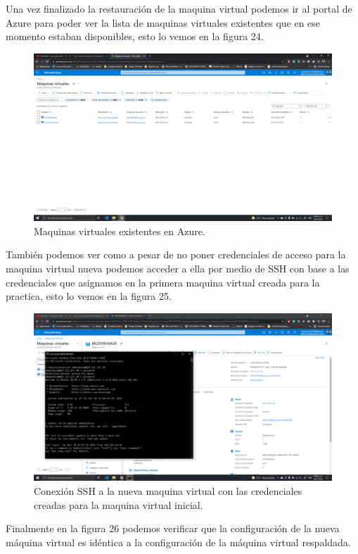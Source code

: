 \documentclass[11pt]{article}
\begin{document}
			Una vez finalizado la restauración de la maquina virtual podemos ir al portal de Azure para poder ver la lista de maquinas virtuales existentes que en ese momento estaban disponibles, esto lo vemos en la figura 24.
		\begin{figure}[H]
			\centering
			\includegraphics[scale=0.34]{resources/3.13.png}
			\caption{Maquinas virtuales existentes en Azure.}\label{fig:picture}
		\end{figure}
		También podemos ver como a pesar de no poner credenciales de acceso para la maquina virtual nueva podemos acceder a ella por medio de SSH con base a las credenciales que asignamos en la primera maquina virtual creada para la practica, esto lo vemos en la figura 25.
		\begin{figure}[H]
			\centering
			\includegraphics[scale=0.34]{resources/3.14.png}
			\caption{Conexión SSH a la nueva maquina virtual con las credenciales creadas para la maquina virtual inicial.}\label{fig:picture}
		\end{figure}
		Finalmente en la figura 26 podemos verificar que la configuración de la nueva máquina virtual es idéntica a la configuración de la máquina virtual respaldada.
\end{document}
